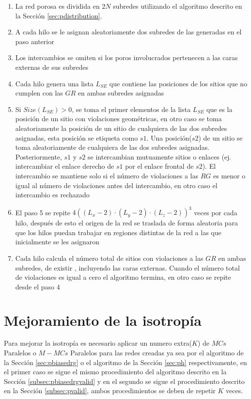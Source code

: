 \begin{enumerate}
\item La red porosa es dividida en $2N$ subredes utilizando el algoritmo descrito en la Sección \ref{sec:pdistribution}.

\item A cada hilo se le asignan aleatoriamente dos subredes de las generadas en el paso anterior

\item Los intercambios se omiten si los poros involucrados pertenecen a las caras  externas de sus subredes

\item Cada hilo genera una lista $L_{SE}$ que contiene las posiciones de los sitios que no cumplen con las $GR$ en ambas subredes asignadas 

\item Si $Size(L_{SE}) > 0$, se toma el primer elementos de la lista $L_{SE}$ que es la posición de un sitio con violaciones geométricas, en otro caso se toma aleatoriamente la posición de un sitio de cualquiera de las dos subredes asignadas, esta posición se etiqueta como $s1$. Una posición($s2$) de un sitio se toma aleatoriamente de cualquiera de las dos subredes asignadas. Posteriormente, $s1$ y $s2$ se intercambian mutuamente sitios o enlaces (ej. intercambiar el enlace derecho de $s1$ por el enlace frontal de $s2$). El intercambio se mantiene solo si el número de violaciones a las $RG$ es menor o igual al número de violaciones antes del intercambio, en otro caso el intercambio es rechazado

\item El paso 5 se repite $4(( L_x  - 2) \cdot (L_y - 2) \cdot (L_z - 2))^3$ veces por cada hilo, después de esto el origen de la red se traslada de forma aleatoria para que los hilos puedan trabajar en regiones distintas de la red a las que inicialmente se les asignaron

\item Cada hilo calcula el número total de sitios con violaciones a las $GR$ en ambas subredes, de existir , incluyendo las caras externas. Cuando el número total de violaciones es igual a cero el algoritmo termina, en otro caso se repite desde el paso 4
\end{enumerate}

\section{Mejoramiento de la isotropía}
\label{subsec:pisotropy}
Para mejorar la isotropía es necesario aplicar un numero extra($K$) de $MCs$ Paralelos o $M-MCs$ Paralelos para las redes creadas ya sea por el algoritmo de la Sección \ref{sec:pbiasedrg} o el algoritmo de la Sección \ref{sec:ph} respectivamente, en el primer caso se sigue el mismo procedimiento del algoritmo descrito en la Secci\'on \ref{subsec:pbiasedrgvalid} y en el segundo se sigue el procedimiento descrito en la Sección \ref{subsec:pvalid}, ambos procedimientos se deben de repetir $K$ veces.